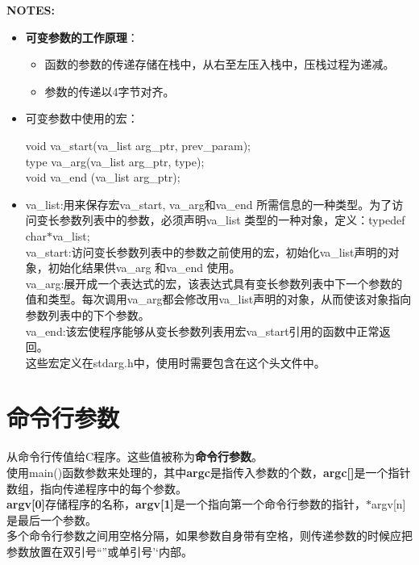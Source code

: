 \documentclass[UTF8]{ctexart}
\begin{document}
			\begin{framed}
				\textbf{NOTES:}\\
				\begin{itemize}
					\item \textbf{可变参数的工作原理}：\begin{itemize}
						\item 函数的参数的传递存储在栈中，从右至左压入栈中，压栈过程为递减。
						\item 参数的传递以4字节对齐。
					\end{itemize}
					\item 可变参数中使用的宏：\begin{framed}
						void va\_start(va\_list arg\_ptr, prev\_param);\\
						type va\_arg(va\_list arg\_ptr, type);\\
						void va\_end (va\_list arg\_ptr);
					\end{framed}
					\item va\_list:用来保存宏va\_start, va\_arg和va\_end 所需信息的一种类型。为了访问变长参数列表中的参数，必须声明va\_list 类型的一种对象，定义：typedef char$*$va\_list;\\va\_start:访问变长参数列表中的参数之前使用的宏，初始化va\_list声明的对象，初始化结果供va\_arg 和va\_end 使用。\\va\_arg:展开成一个表达式的宏，该表达式具有变长参数列表中下一个参数的值和类型。每次调用va\_arg都会修改用va\_list声明的对象，从而使该对象指向参数列表中的下个参数。\\ va\_end:该宏使程序能够从变长参数列表用宏va\_start引用的函数中正常返回。\\这些宏定义在stdarg.h中，使用时需要包含在这个头文件中。
				\end{itemize}
			\end{framed}
			
			\clearpage
			\section{命令行参数}
			从命令行传值给C程序。这些值被称为\textbf{命令行参数}。\\
			使用main()函数参数来处理的，其中\textbf{argc}是指传入参数的个数，\textbf{argc[]}是一个指针数组，指向传递程序中的每个参数。\\
			\textbf{argv[0]}存储程序的名称，\textbf{argv[1]}是一个指向第一个命令行参数的指针，$*$argv[n]是最后一个参数。\\
			多个命令行参数之间用空格分隔，如果参数自身带有空格，则传递参数的时候应把参数放置在双引号“”或单引号’‘内部。
	
\end{document}
